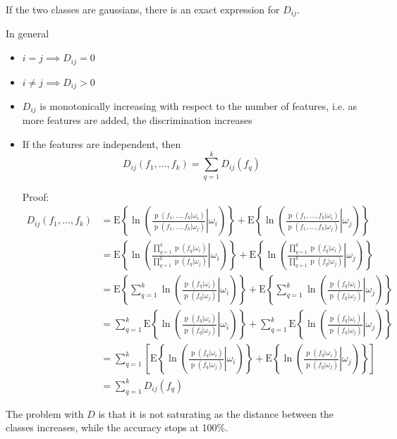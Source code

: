\documentclass[oneside,onecolumn]{report}
\newcommand{\E}[1]{\text{E} \left\{ #1 \right\}}
\DeclareMathOperator*{\pdf}{p}
\begin{document}
If the two classes are gaussians, there is an exact expression for $D_{i j}$.

In general
\begin{itemize}
    \item $i = j \implies D_{i j} = 0$
    \item $i \neq j \implies D_{i j} > 0$
    \item $D_{i j}$ is monotonically increasing with respect to the number of features, i.e. as more features are added, the discrimination increases
    \item If the features are independent, then
    $$ D_{i j}(f_1, \dots, f_k) = \sum_{q = 1}^k D_{i j}(f_q) $$

    Proof:
    \begin{align*}
        D_{i j}(f_1, \dots, f_k)
        &=
        \E{\ln( \left. \frac{\pdf(f_1, \dots, f_k | \omega_i)}{\pdf(f_1, \dots, f_k  | \omega_j)} \right| \omega_i)} +
        \E{\ln( \left. \frac{\pdf(f_1, \dots, f_k | \omega_i)}{\pdf(f_1, \dots, f_k  | \omega_j)} \right| \omega_j)} \\
        &=
        \E{\ln( \left. \frac{\prod_{q = 1}^k \pdf(f_q | \omega_i)}{\prod_{q = 1}^k \pdf(f_q | \omega_j)} \right| \omega_i)} +
        \E{\ln( \left. \frac{\prod_{q = 1}^k \pdf(f_q | \omega_i)}{\prod_{q = 1}^k \pdf(f_q | \omega_j)} \right| \omega_j)} \\
        &=
        \E{ \sum_{q = 1}^k \ln( \left. \frac{\pdf(f_q | \omega_i)}{\pdf(f_q | \omega_j)} \right| \omega_i)} +
        \E{ \sum_{q = 1}^k \ln( \left. \frac{\pdf(f_q | \omega_i)}{\pdf(f_q | \omega_j)} \right| \omega_j)} \\
        &=
        \sum_{q = 1}^k \E{ \ln( \left. \frac{\pdf(f_q | \omega_i)}{\pdf(f_q | \omega_j)} \right| \omega_i)} +
        \sum_{q = 1}^k \E{ \ln( \left. \frac{\pdf(f_q | \omega_i)}{\pdf(f_q | \omega_j)} \right| \omega_j)} \\
        &=
        \sum_{q = 1}^k \left[ \E{ \ln( \left. \frac{\pdf(f_q | \omega_i)}{\pdf(f_q | \omega_j)} \right| \omega_i)} +
        \E{ \ln( \left. \frac{\pdf(f_q | \omega_i)}{\pdf(f_q | \omega_j)} \right| \omega_j)} \right] \\
        &= \sum_{q = 1}^k D_{i j}(f_q)
    \end{align*}
\end{itemize}

The problem with $D$ is that it is not saturating as the distance between the classes increases, while the accuracy stops at 100\%.
\end{document}
